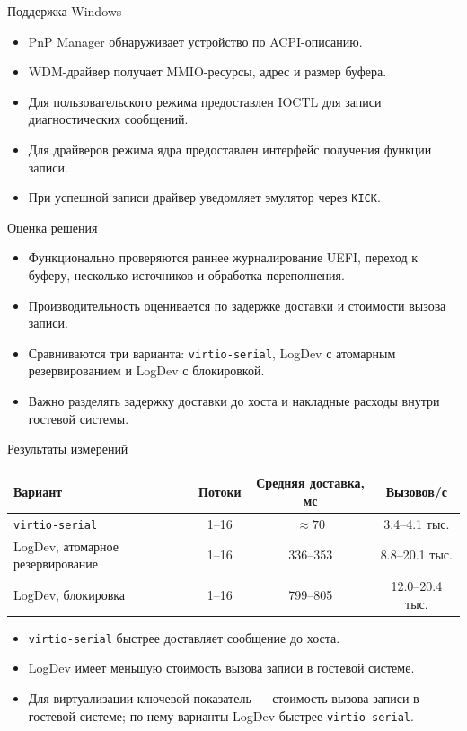 \documentclass[aspectratio=169, 11pt]{beamer}
\begin{document}
\begin{frame}{Поддержка Windows}
    \begin{itemize}
        \item PnP Manager обнаруживает устройство по ACPI-описанию.
        \item WDM-драйвер получает MMIO-ресурсы, адрес и размер буфера.
        \item Для пользовательского режима предоставлен IOCTL для записи диагностических сообщений.
        \item Для драйверов режима ядра предоставлен интерфейс получения функции записи.
        \item При успешной записи драйвер уведомляет эмулятор через \texttt{KICK}.
    \end{itemize}
\end{frame}

\begin{frame}{Оценка решения}
    \begin{itemize}
        \item Функционально проверяются раннее журналирование UEFI, переход к буферу, несколько источников и обработка переполнения.
        \item Производительность оценивается по задержке доставки и стоимости вызова записи.
        \item Сравниваются три варианта: \texttt{virtio-serial}, LogDev с атомарным резервированием и LogDev с блокировкой.
        \item Важно разделять задержку доставки до хоста и накладные расходы внутри гостевой системы.
    \end{itemize}
\end{frame}

\begin{frame}{Результаты измерений}
    \begin{table}
        \small
        \begin{tabular}{lccc}
            \toprule
            Вариант & Потоки & Средняя доставка, мс & Вызовов/с \\
            \midrule
            \texttt{virtio-serial} & 1--16 & $\approx 70$ & 3.4--4.1 тыс. \\
            LogDev, атомарное резервирование & 1--16 & 336--353 & 8.8--20.1 тыс. \\
            LogDev, блокировка & 1--16 & 799--805 & 12.0--20.4 тыс. \\
            \bottomrule
        \end{tabular}
    \end{table}

    \vspace{0.25cm}
    \begin{itemize}
        \item \texttt{virtio-serial} быстрее доставляет сообщение до хоста.
        \item LogDev имеет меньшую стоимость вызова записи в гостевой системе.
        \item Для виртуализации ключевой показатель --- стоимость вызова записи в гостевой системе; по нему варианты LogDev быстрее \texttt{virtio-serial}.
    \end{itemize}
\end{frame}
\end{document}
